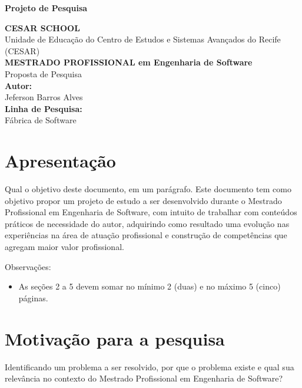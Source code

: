 \documentclass[10pt,a4paper]{article}
\begin{document}
\begin{titlepage}
\begin{center}{\bf \Large Projeto de Pesquisa}\\[3.5cm]
\end{center}
\begin{flushright}
{\bf CESAR SCHOOL}\\
{Unidade de Educação do Centro de Estudos e Sistemas Avançados do Recife}
{(CESAR)}\\[3.5cm]
{\bf \large MESTRADO PROFISSIONAL em Engenharia de Software}\\
{Proposta de Pesquisa}\\[2.5cm] 
{\bf Autor:}\\
{Jeferson Barros Alves}\\[0.8cm]
{\bf Linha de Pesquisa:}\\
{Fábrica de Software}\\[0.8cm]
\end{flushright}
\end{titlepage}
 
\tableofcontents

\newpage

\section{Apresentação}
Qual o objetivo deste documento, em um parágrafo.
Este documento tem como objetivo propor um projeto de estudo a ser desenvolvido durante o Mestrado Profissional em Engenharia de Software, com intuito de trabalhar com conteúdos práticos de necessidade do autor, adquirindo como resultado uma evolução nas experiências na área de atuação profissional e construção de competências que agregam maior valor profissional.

Observações:
\begin{itemize}
\item As seções 2 a 5 devem somar no mínimo 2 (duas) e no máximo 5 (cinco) páginas.
\end{itemize}
\section{Motivação para a pesquisa}
Identificando um problema a ser resolvido, \cite{Mazo2012} por que o problema existe e qual sua relevância
no contexto do Mestrado Profissional em Engenharia de Software?
\end{document}
